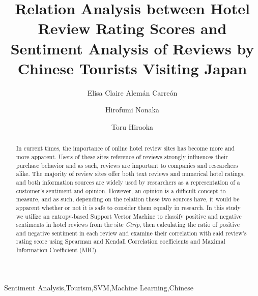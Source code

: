 \documentclass[review]{elsarticle}
\begin{document}
\begin{frontmatter}

\title{Relation Analysis between Hotel Review Rating Scores and Sentiment Analysis of Reviews by Chinese Tourists Visiting Japan}

\author[gidai]{Elisa Claire Alem\'an Carre\'on
}

\author[gidai]{Hirofumi Nonaka}

\author[nagasaki]{Toru Hiraoka}

\address[gidai]{Nagaoka University of Technology, Nagaoka, Japan}
\address[nagasaki]{University of Nagasaki, Nagasaki, Japan}


\begin{abstract}

In current times, the importance of online hotel review sites has become more and more apparent. Users of these sites reference of reviews strongly influences their purchase behavior and as such, reviews are important to companies and researchers alike. The majority of review sites offer both text reviews and numerical hotel ratings, and both information sources are widely used by researchers as a representation of a customer's sentiment and opinion. However, an opinion is a difficult concept to measure, and as such, depending on the relation these two sources have, it would be apparent whether or not it is safe to consider them equally in research. In this study we utilize an entropy-based Support Vector Machine to classify positive and negative sentiments in hotel reviews from the site \textit{Ctrip}, then calculating the ratio of positive and negative sentiment in each review and examine their correlation with said review's rating score using Spearman and Kendall Correlation coefficients and Maximal Information Coefficient (MIC).


\end{abstract}

\begin{keyword}

Sentiment Analysis\sep Tourism\sep SVM\sep Machine Learning\sep Chinese

\end{keyword}

\end{frontmatter}
\end{document}
